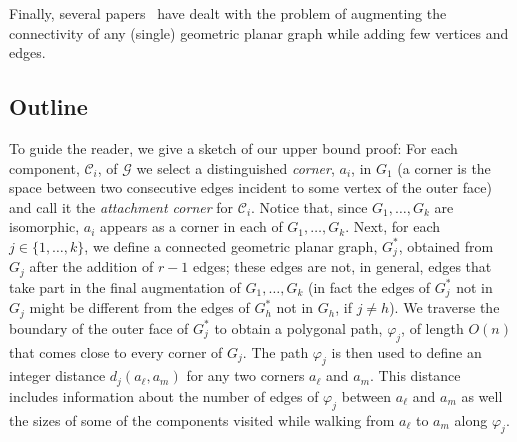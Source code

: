 \documentclass{patmorin}
\begin{document}
Finally, several papers~\cite{aghtu-acgg-08,rw-acpgg-12,t-capsg-12} have dealt with the problem of augmenting the connectivity of any (single) geometric planar graph while adding few vertices and edges.

\subsection{Outline} 

To guide the reader, we give a sketch of our upper bound proof: For each component, $\mathcal C_i$, of $\mathcal G$ we select a distinguished \emph{corner}, $a_i$, in $G_1$ (a corner is the space between two consecutive edges incident to some vertex of the outer face) and call it the \emph{attachment corner} for $\mathcal C_i$.  Notice that, since $G_1,\ldots,G_k$ are isomorphic, $a_i$ appears as a corner in each of $G_1,\ldots,G_k$. Next, for each $j\in \{1,\dots,k\}$, we define a connected geometric planar graph, $G_j^*$, obtained from $G_j$ after the addition of $r-1$ edges; these edges are not, in general, edges that take part in the final augmentation of $G_1,\ldots,G_k$ (in fact the edges of $G_j^*$ not in $G_j$ might be different from the edges of  $G_h^*$ not in $G_h$, if $j\neq h$). We traverse the boundary of the outer face
of $G_j^*$ to obtain a polygonal path, $\varphi_j$, of length $O(n)$ that comes
close to every corner of $G_j$.  The path $\varphi_j$ is then used to define an
integer distance $d_j(a_\ell,a_m)$ for any two corners $a_\ell$ and $a_m$. This distance includes information about the number of edges of $\varphi_j$ between $a_\ell$ and $a_m$ as well the sizes of some of the components visited while walking from $a_\ell$ to $a_m$ along $\varphi_j$.
\end{document}
